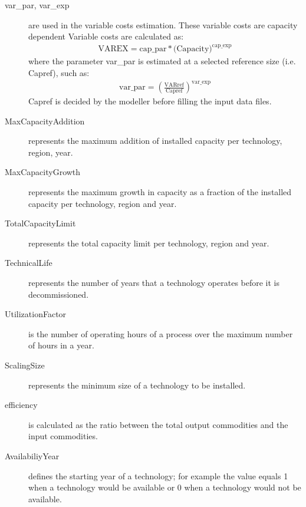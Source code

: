 \documentclass[letterpaper,10pt,english]{sphinxmanual}
\begin{document}
\begin{description}
\item[{var\_par, var\_exp}] \leavevmode
are used in the variable costs estimation. These variable costs are capacity
dependent Variable costs are calculated as:
\begin{equation*}
\begin{split}\text{VAREX} = \text{cap\_par} * \text{(Capacity)}^{\text{cap\_exp}}\end{split}
\end{equation*}
where the parameter var\_par is estimated at a selected reference size (i.e. Capref),
such as:
\begin{equation*}
\begin{split}\text{var\_par} = \left(
   \frac{\text{VARref}}{\text{Capref}}
\right)^{\text{var\_exp}}\end{split}
\end{equation*}
Capref is decided by the modeller before filling the input data files.

\item[{MaxCapacityAddition}] \leavevmode
represents the maximum addition of installed capacity per technology, region, year.

\item[{MaxCapacityGrowth}] \leavevmode
represents the maximum growth in capacity as a fraction of the installed capacity per
technology, region and year.

\item[{TotalCapacityLimit}] \leavevmode
represents the total capacity limit per technology, region and year.

\item[{TechnicalLife}] \leavevmode
represents the number of years that a technology operates before it is decommissioned.

\item[{UtilizationFactor}] \leavevmode
is the number of operating hours of a process over the maximum number of hours in a year.

\item[{ScalingSize}] \leavevmode
represents the minimum size of a technology to be installed.

\item[{efficiency}] \leavevmode
is calculated as the ratio between the total output commodities and the input commodities.

\item[{AvailabiliyYear}] \leavevmode
defines the starting year of a technology; for example the value equals 1 when a
technology would be available or 0 when a technology would not be available.


\end{description}
\end{document}
